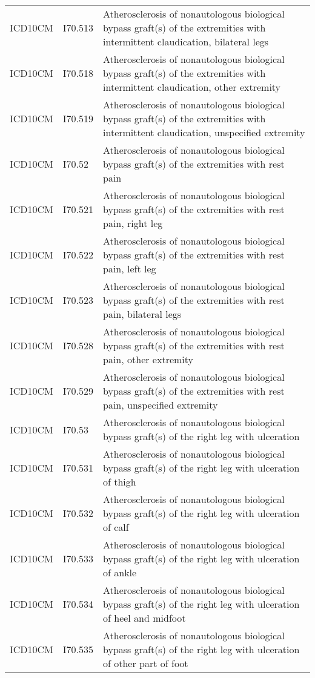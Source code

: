 \begin{longtable}{p{}p{}p{}}
  ICD10CM & I70.513 & Atherosclerosis of nonautologous biological bypass graft(s) of the extremities with intermittent claudication, bilateral legs \\ 
  ICD10CM & I70.518 & Atherosclerosis of nonautologous biological bypass graft(s) of the extremities with intermittent claudication, other extremity \\ 
  ICD10CM & I70.519 & Atherosclerosis of nonautologous biological bypass graft(s) of the extremities with intermittent claudication, unspecified extremity \\ 
  ICD10CM & I70.52 & Atherosclerosis of nonautologous biological bypass graft(s) of the extremities with rest pain \\ 
  ICD10CM & I70.521 & Atherosclerosis of nonautologous biological bypass graft(s) of the extremities with rest pain, right leg \\ 
  ICD10CM & I70.522 & Atherosclerosis of nonautologous biological bypass graft(s) of the extremities with rest pain, left leg \\ 
  ICD10CM & I70.523 & Atherosclerosis of nonautologous biological bypass graft(s) of the extremities with rest pain, bilateral legs \\ 
  ICD10CM & I70.528 & Atherosclerosis of nonautologous biological bypass graft(s) of the extremities with rest pain, other extremity \\ 
  ICD10CM & I70.529 & Atherosclerosis of nonautologous biological bypass graft(s) of the extremities with rest pain, unspecified extremity \\ 
  ICD10CM & I70.53 & Atherosclerosis of nonautologous biological bypass graft(s) of the right leg with ulceration \\ 
  ICD10CM & I70.531 & Atherosclerosis of nonautologous biological bypass graft(s) of the right leg with ulceration of thigh \\ 
  ICD10CM & I70.532 & Atherosclerosis of nonautologous biological bypass graft(s) of the right leg with ulceration of calf \\ 
  ICD10CM & I70.533 & Atherosclerosis of nonautologous biological bypass graft(s) of the right leg with ulceration of ankle \\ 
  ICD10CM & I70.534 & Atherosclerosis of nonautologous biological bypass graft(s) of the right leg with ulceration of heel and midfoot \\ 
  ICD10CM & I70.535 & Atherosclerosis of nonautologous biological bypass graft(s) of the right leg with ulceration of other part of foot \\ 

\end{longtable}
